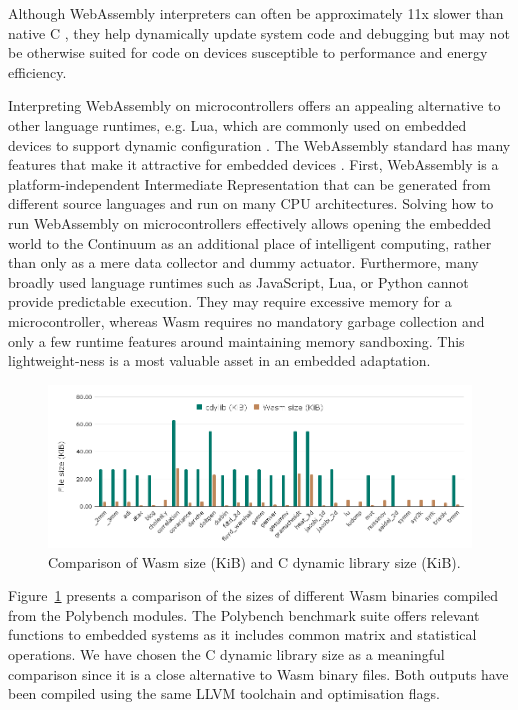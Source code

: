 Although WebAssembly interpreters can often be approximately 11x slower than native C \cite{wasm3-performance}, they help dynamically update system code and debugging but may not be otherwise suited for code on devices susceptible to performance and energy efficiency.

Interpreting WebAssembly on microcontrollers offers an appealing alternative to other language runtimes, e.g. Lua, which are commonly used on embedded devices to support dynamic configuration \cite{brzoza2016embedded}. The WebAssembly standard has many features that make it attractive for embedded devices \cite{peach2020ewasm}. First, WebAssembly is a platform-independent Intermediate Representation that can be generated from different source languages and run on many CPU architectures. Solving how to run WebAssembly on microcontrollers effectively allows opening the embedded world to the Continuum as an additional place of intelligent computing, rather than only as a mere data collector and dummy actuator. Furthermore, many broadly used language runtimes such as JavaScript, Lua, or Python cannot provide predictable execution. They may require excessive memory for a microcontroller, whereas Wasm requires no mandatory garbage collection and only a few runtime features around maintaining memory sandboxing. This lightweight-ness is a most valuable asset in an embedded adaptation.

\begin{figure}[ht]
\centering
\includegraphics[width=\columnwidth]{figures/b-wasmi-3}
\caption{Comparison of Wasm size (KiB) and C dynamic library size (KiB).} \label{fig:b-wasmi-3}
\end{figure}

Figure~\ref{fig:b-wasmi-3} presents a comparison of the sizes of different Wasm binaries compiled from the Polybench \cite{yuki2014understanding} modules. The Polybench benchmark suite offers relevant functions to embedded systems as it includes common matrix and statistical operations. We have chosen the C dynamic library size as a meaningful comparison since it is a close alternative to Wasm binary files. Both outputs have been compiled using the same LLVM toolchain and optimisation flags.


